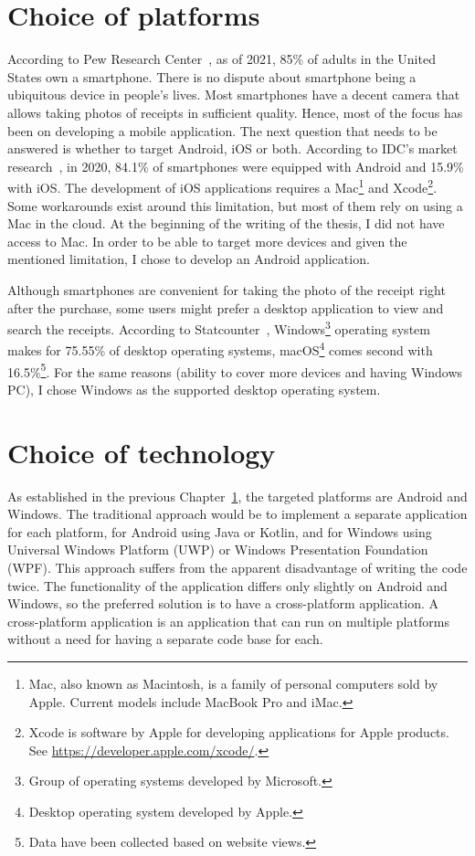 \documentclass[
  digital, %
  table,   %
  oneside, %
  lof,     %
  lot,     %
]{fithesis3}
\begin{document}
\chapter{Choice of platforms}
\label{chap:choice_of_platforms}
According to Pew Research Center~\cite{PewResearchCenter2021Mobile}, as of 2021, 85\% of adults in the United States own a smartphone. There is no dispute about smartphone being a ubiquitous device in people's lives. 
Most smartphones have a decent camera that allows taking photos of receipts in sufficient quality. Hence, most of the focus has been on developing a mobile application.
The next question that needs to be answered is whether to target Android, iOS or both. According to IDC's market research~\cite{Idc2021Smartphone}, in 2020, 84.1\% of smartphones were equipped with Android and 15.9\% with iOS. The development of iOS applications requires a Mac\footnote{Mac, also known as Macintosh, is a family of personal computers sold by Apple. Current models include MacBook Pro and iMac.} and Xcode\footnote{Xcode is software by Apple for developing applications for Apple products.\\See \url{https://developer.apple.com/xcode/}.}. Some workarounds exist around this limitation, but most of them rely on using a Mac in the cloud. At the beginning of the writing of the thesis, I did not have access to Mac. In order to be able to target more devices and given the mentioned limitation, I chose to develop an Android application.

Although smartphones are convenient for taking the photo of the receipt right after the purchase, some users might prefer a desktop application to view and search the receipts.
According to Statcounter~\cite{Statcounter2021Desktop}, Windows\footnote{Group of operating systems developed by Microsoft.} operating system makes for 75.55\% of desktop operating systems, macOS\footnote{Desktop operating system developed by Apple.} comes second with 16.5\%\footnote{Data have been collected based on website views.}.
For the same reasons (ability to cover more devices and having Windows PC), I chose Windows as the supported desktop operating system.

\chapter{Choice of technology}
As established in the previous Chapter~\ref{chap:choice_of_platforms}, the targeted platforms are Android and Windows. The traditional approach would be to implement a separate application for each platform, for Android using Java or Kotlin, and for Windows using Universal Windows Platform (UWP) or Windows Presentation Foundation (WPF). This approach suffers from the apparent disadvantage of writing the code twice. The functionality of the application differs only slightly on Android and Windows, so the preferred solution is to have a cross-platform application. A cross-platform application is an application that can run on multiple platforms without a need for having a separate code base for each.
\end{document}
